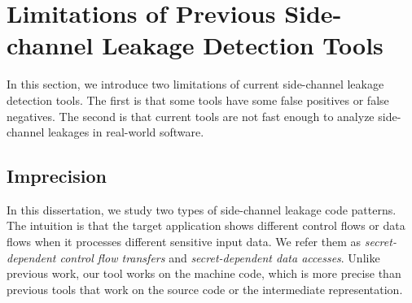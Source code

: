 \section{Limitations of Previous Side-channel Leakage Detection Tools}
In this section, we introduce two limitations of current side-channel leakage detection tools. The first is that some tools have some false positives or false negatives. The second is that current tools are not fast enough to analyze side-channel leakages in real-world software.


\subsection{Imprecision}
In this dissertation, we study two types of side-channel leakage code patterns. The intuition is that the target application shows different control flows or data flows when it processes different sensitive input data. We refer them as \textit{secret-dependent control flow transfers} and \textit{secret-dependent data accesses}. Unlike previous work, our tool works on the machine code, which is more precise than previous tools that work on the source code or the intermediate representation.
